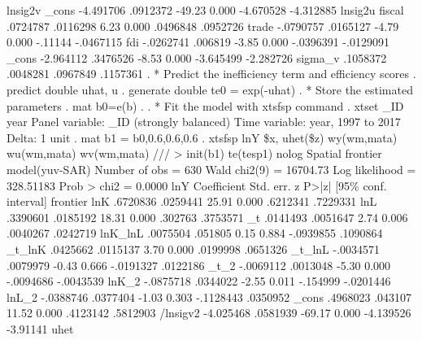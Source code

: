 lnsig2v      {\VBAR}
       _cons {\VBAR}  -4.491706   .0912372   -49.23   0.000    -4.670528   -4.312885
lnsig2u      {\VBAR}
      fiscal {\VBAR}   .0724787   .0116298     6.23   0.000     .0496848    .0952726
       trade {\VBAR}  -.0790757   .0165127    -4.79   0.000      -.11144   -.0467115
         fdi {\VBAR}  -.0262741    .006819    -3.85   0.000    -.0396391   -.0129091
       _cons {\VBAR}  -2.964112   .3476526    -8.53   0.000    -3.645499   -2.282726
     sigma_v {\VBAR}   .1058372   .0048281                      .0967849    .1157361
{\smallskip}
. * Predict the inefficiency term and efficiency scores
. predict double uhat, u
{\smallskip}
. generate double te0 = exp(-uhat) 
{\smallskip}
. * Store the estimated parameters
. mat b0=e(b)
{\smallskip}
. 
. * Fit the model with xtsfsp command
. xtset _ID year
{\smallskip}
Panel variable: _ID (strongly balanced)
 Time variable: year, 1997 to 2017
         Delta: 1 unit
{\smallskip}
. mat b1 = b0,0.6,0.6,0.6
{\smallskip}
. xtsfsp lnY \$x, uhet(\$z) wy(wm,mata) wu(wm,mata) wv(wm,mata) ///
>                init(b1) te(tesp1) nolog 
{\smallskip}
Spatial frontier model(yuv-SAR)                       Number of obs =      630
                                                      Wald chi2(9)  = 16704.73
Log likelihood = 328.51183                            Prob > chi2   =   0.0000
{\smallskip}
         lnY {\VBAR} Coefficient  Std. err.      z    P>|z|     [95\% conf. interval]
frontier     {\VBAR}
         lnK {\VBAR}   .6720836   .0259441    25.91   0.000     .6212341    .7229331
         lnL {\VBAR}   .3390601   .0185192    18.31   0.000      .302763    .3753571
          _t {\VBAR}   .0141493   .0051647     2.74   0.006     .0040267    .0242719
     lnK_lnL {\VBAR}   .0075504    .051805     0.15   0.884    -.0939855    .1090864
      _t_lnK {\VBAR}   .0425662   .0115137     3.70   0.000     .0199998    .0651326
      _t_lnL {\VBAR}  -.0034571   .0079979    -0.43   0.666    -.0191327    .0122186
        _t_2 {\VBAR}  -.0069112   .0013048    -5.30   0.000    -.0094686   -.0043539
       lnK_2 {\VBAR}  -.0875718   .0344022    -2.55   0.011     -.154999   -.0201446
       lnL_2 {\VBAR}  -.0388746   .0377404    -1.03   0.303    -.1128443    .0350952
       _cons {\VBAR}   .4968023    .043107    11.52   0.000     .4123142    .5812903
    /lnsigv2 {\VBAR}  -4.025468   .0581939   -69.17   0.000    -4.139526    -3.91141
uhet         {\VBAR}
